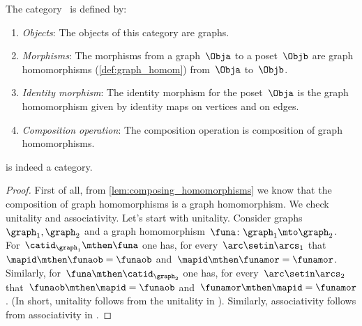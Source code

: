 \begin{ctdefinition}
    \label{def:Grph}
    The category~\iindex{\Grph} is defined by:
    \begin{enumerate}
        \item \emph{Objects}: The objects of this category are graphs.
        \item \emph{Morphisms}: The morphisms from a graph~$\Obja$ to a poset~$\Objb$ are graph homomorphisms (\cref{def:graph_homom}) from~$\Obja$ to~$\Objb$.
        \item \emph{Identity morphism}: The identity morphism for the poset~$\Obja$
              is the graph homomorphism given by identity maps on vertices and on edges.
        \item \emph{Composition operation}: The composition operation is composition of graph homomorphisms.
    \end{enumerate}
\end{ctdefinition}

\begin{lemma}
    \Grph is indeed a category.
\end{lemma}

\begin{proof}
    First of all, from \cref{lem:composing_homomorphisms} we know that the composition of graph homomorphisms is a graph homomorphism.
    We check unitality and associativity.
    Let's start with unitality.
    Consider graphs~$\graph_1,\graph_2$ and a graph homomorphism~$\funa\colon \graph_1\mto \graph_2$.
    For~$\catid_{\graph_1}\mthen \funa$ one has, for every~$\arc \setin \arcs_1$ that~$\mapid\mthen \funaob=\funaob$ and~$\mapid\mthen \funamor=\funamor$.
    Similarly, for~$\funa \mthen \catid_{\graph_2}$ one has, for every~$\arc \setin \arcs_2$ that~$\funaob\mthen \mapid=\funaob$ and~$\funamor \mthen \mapid=\funamor$.
    (In short, unitality follows from the unitality in \Set).
    Similarly, associativity follows from associativity in \Set.
\end{proof}